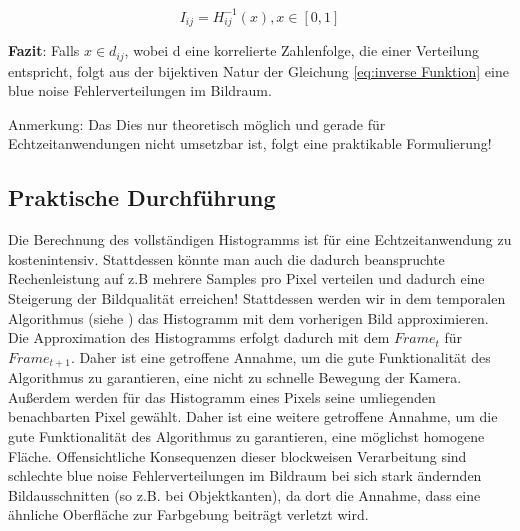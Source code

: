 \begin{equation}\label{eq:inverse Funktion}
    I_{ij} = H_{ij}^{-1}(x), x \in [0,1]
\end{equation}

\par

\textbf{Fazit}: Falls $x \in d_{ij}$, wobei d eine korrelierte Zahlenfolge, die einer 
 Verteilung entspricht, folgt aus der bijektiven
Natur der Gleichung \ref{eq:inverse Funktion} eine blue noise
Fehlerverteilungen im Bildraum. 

Anmerkung: Das Dies nur theoretisch möglich und gerade für Echtzeitanwendungen nicht umsetzbar ist, 
folgt eine praktikable Formulierung!

\subsection{Praktische Durchführung}

Die Berechnung des vollständigen Histogramms ist für eine Echtzeitanwendung
zu kostenintensiv. Stattdessen könnte man auch die dadurch beanspruchte 
Rechenleistung auf z.B mehrere Samples pro Pixel verteilen und dadurch eine 
Steigerung der Bildqualität erreichen!
Stattdessen werden wir in dem temporalen Algorithmus (siehe \cite{hal02158423})
das Histogramm mit dem vorherigen Bild approximieren. 
Die Approximation des Histogramms erfolgt dadurch mit dem $Frame_{t}$ 
für $Frame_{t+1}$. Daher ist eine getroffene Annahme, um die gute Funktionalität des 
Algorithmus zu garantieren, eine nicht zu schnelle Bewegung der Kamera.
Außerdem werden für das Histogramm eines Pixels seine umliegenden benachbarten Pixel gewählt.
Daher ist eine weitere getroffene Annahme, um die gute Funktionalität des 
Algorithmus zu garantieren, eine möglichst homogene Fläche. 
Offensichtliche Konsequenzen dieser blockweisen Verarbeitung sind schlechte blue noise 
Fehlerverteilungen im Bildraum bei sich stark ändernden Bildausschnitten
(so z.B. bei Objektkanten), da dort die Annahme, dass eine ähnliche Oberfläche
zur Farbgebung beiträgt verletzt wird.

